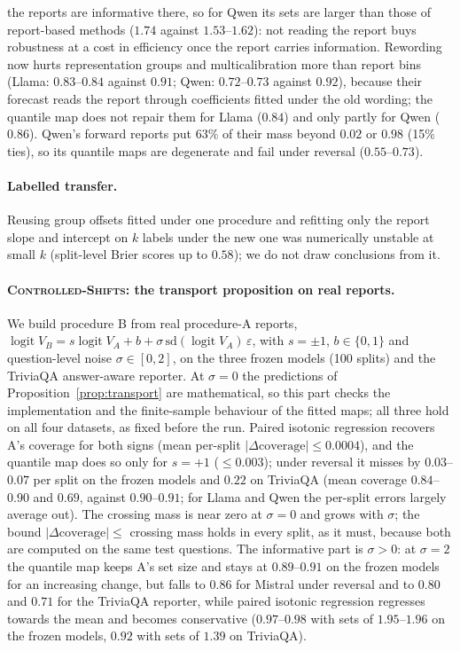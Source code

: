 \documentclass[11pt]{article}
\theoremstyle{definition}
\theoremstyle{remark}
\newcommand{\1}{\mathbf{1}}
\newcommand{\expname}[1]{\textsc{#1}}
\begin{document}
the reports are informative there, so for Qwen its sets are larger than those of report-based methods
($1.74$ against $1.53$--$1.62$): not reading the report buys robustness at a cost in efficiency once the
report carries information. Rewording now hurts representation groups and multicalibration more than
report bins (Llama: $0.83$--$0.84$ against $0.91$; Qwen: $0.72$--$0.73$ against $0.92$), because their forecast
reads the report through coefficients fitted under the old wording; the quantile map does not repair
them for Llama ($0.84$) and only partly for Qwen ($0.86$). Qwen's forward reports put 63\% of their mass beyond $0.02$ or $0.98$ (15\% ties), so its
quantile maps are degenerate and fail under reversal ($0.55$--$0.73$).

\paragraph{Labelled transfer.} Reusing group offsets fitted under one procedure and refitting only the
report slope and intercept on $k$ labels under the new one was numerically unstable at small $k$
(split-level Brier scores up to $0.58$); we do not draw conclusions from it.

\paragraph{\expname{Controlled-Shifts}: the transport proposition on real reports.} We build
procedure B from real procedure-A reports, $\operatorname{logit}V_B=s\operatorname{logit}V_A+b+\sigma\,
\mathrm{sd}(\operatorname{logit}V_A)\,\varepsilon$, with $s=\pm1$, $b\in\{0,1\}$ and question-level noise
$\sigma\in[0,2]$, on the three frozen models (100 splits) and the TriviaQA answer-aware reporter. At
$\sigma=0$ the predictions of Proposition~\ref{prop:transport} are mathematical, so this part checks the
implementation and the finite-sample behaviour of the fitted maps; all three hold on all four datasets,
as fixed before the run. Paired isotonic regression recovers A's coverage for both signs (mean per-split
$|\Delta\text{coverage}|\le0.0004$), and the quantile map does so only for $s=+1$ ($\le0.003$); under
reversal it misses by $0.03$--$0.07$ per split on the frozen models and $0.22$ on TriviaQA (mean coverage
$0.84$--$0.90$ and $0.69$, against $0.90$--$0.91$; for Llama and Qwen the per-split errors largely average
out). The crossing mass is near zero at $\sigma=0$ and grows with $\sigma$; the bound
$|\Delta\text{coverage}|\le$ crossing mass holds in every split, as it must, because both are computed on
the same test questions. The informative part is $\sigma>0$: at $\sigma=2$ the quantile map keeps A's set
size and stays at $0.89$--$0.91$ on the frozen models for an increasing change, but falls to $0.86$ for
Mistral under reversal and to $0.80$ and $0.71$ for the TriviaQA reporter, while paired isotonic regression
regresses towards the mean and becomes conservative ($0.97$--$0.98$ with sets of $1.95$--$1.96$ on the frozen
models, $0.92$ with sets of $1.39$ on TriviaQA).
\end{document}
